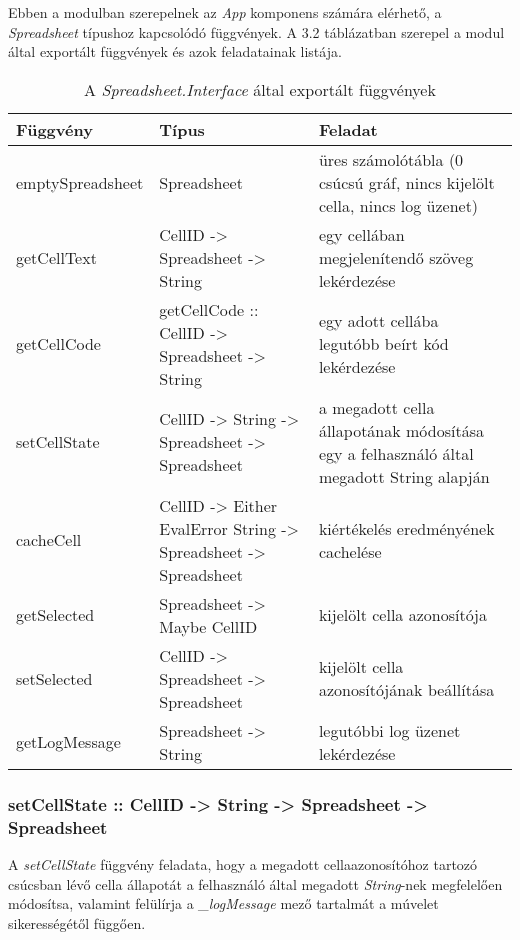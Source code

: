 Ebben a modulban szerepelnek az \textit{App} komponens számára elérhető, a \textit{Spreadsheet} típushoz kapcsolódó függvények. A 3.2 táblázatban szerepel a modul által exportált függvények és azok feladatainak listája.

\begin{table}
	\centering
	\begin{tabularx}{\textwidth}{ |l|X|X|}
		\hline
		Függvény & Típus & Feladat \\
		\hline\hline
		emptySpreadsheet & Spreadsheet & üres számolótábla (0 csúcsú gráf, nincs kijelölt cella, nincs log üzenet) \\
		\hline
		getCellText & CellID -> Spreadsheet -> String & egy cellában megjelenítendő szöveg lekérdezése \\
		\hline
		getCellCode & getCellCode :: CellID -> Spreadsheet -> String & egy adott cellába legutóbb beírt kód lekérdezése \\
		\hline
		setCellState & CellID -> String -> Spreadsheet -> Spreadsheet & a megadott cella állapotának módosítása egy a felhasználó által megadott String alapján \\
		\hline
		cacheCell & CellID -> Either EvalError String -> Spreadsheet -> Spreadsheet & kiértékelés eredményének cachelése \\
		\hline
		getSelected & Spreadsheet -> Maybe CellID & kijelölt cella azonosítója \\
		\hline
		setSelected & CellID -> Spreadsheet -> Spreadsheet & kijelölt cella azonosítójának beállítása \\
		\hline 
		getLogMessage & Spreadsheet -> String & legutóbbi log üzenet lekérdezése \\
		\hline
	\end{tabularx}
	\caption[A \textit{Spreadsheet.Interface} által exportált függvények]{A \textit{Spreadsheet.Interface} által exportált függvények}
	\label{tab:interface}
\end{table}

\subsubsection{setCellState :: CellID -> String -> Spreadsheet -> Spreadsheet}

A \textit{setCellState} függvény feladata, hogy a megadott cellaazonosítóhoz tartozó csúcsban lévő cella állapotát a felhasználó által megadott \textit{String}-nek megfelelően módosítsa, valamint felülírja a \textit{\_logMessage} mező tartalmát a múvelet sikerességétől függően.

